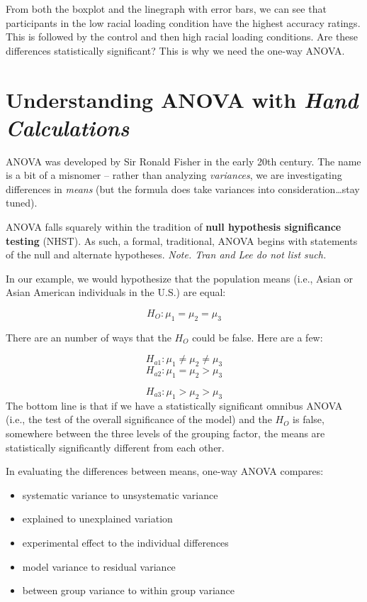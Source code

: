 \documentclass[
  english,
]{book}
\providecommand{\tightlist}{%
  \setlength{\itemsep}{0pt}\setlength{\parskip}{0pt}}
\begin{document}
From both the boxplot and the linegraph with error bars, we can see that participants in the low racial loading condition have the highest accuracy ratings. This is followed by the control and then high racial loading conditions. Are these differences statistically significant? This is why we need the one-way ANOVA.

\hypertarget{understanding-anova-with-hand-calculations}{%
\section{\texorpdfstring{Understanding ANOVA with \emph{Hand Calculations}}{Understanding ANOVA with Hand Calculations}}\label{understanding-anova-with-hand-calculations}}

ANOVA was developed by Sir Ronald Fisher in the early 20th century. The name is a bit of a misnomer -- rather than analyzing \emph{variances}, we are investigating differences in \emph{means} (but the formula does take variances into consideration\ldots stay tuned).

ANOVA falls squarely within the tradition of \textbf{null hypothesis significance testing} (NHST). As such, a formal, traditional, ANOVA begins with statements of the null and alternate hypotheses. \emph{Note. Tran and Lee \citeyearpar{tran_you_2014} do not list such.}

In our example, we would hypothesize that the population means (i.e., Asian or Asian American individuals in the U.S.) are equal:

\[H_{O}:  \mu _{1} = \mu _{2} = \mu _{3}\]

There are an number of ways that the \(H_{O}\) could be false. Here are a few:

\[H_{a1}:  \mu _{1} \neq \mu _{2} \neq \mu _{3}\]
\[H_{a2}:  \mu _{1} =  \mu _{2} > \mu _{3}\]

\[H_{a3}:  \mu _{1} >  \mu _{2} > \mu _{3}\]
The bottom line is that if we have a statistically significant omnibus ANOVA (i.e., the test of the overall significance of the model) and the \(H_{O}\) is false, somewhere between the three levels of the grouping factor, the means are statistically significantly different from each other.

In evaluating the differences between means, one-way ANOVA compares:

\begin{itemize}
\tightlist
\item
  systematic variance to unsystematic variance
\item
  explained to unexplained variation
\item
  experimental effect to the individual differences
\item
  model variance to residual variance
\item
  between group variance to within group variance
\end{itemize}
\end{document}
